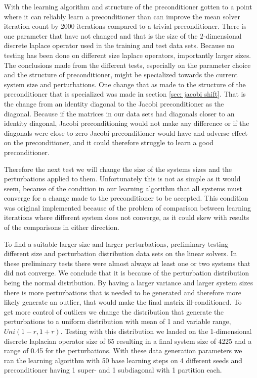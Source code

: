With the learning algorithm and structure of the preconditioner gotten to a point where it can reliably learn a preconditioner than can improve the mean solver iteration count by 2000 iterations compared to a trivial preconditioner. There is one parameter that have not changed and that is the size of the 2-dimensional discrete laplace operator used in the training and test data sets. Because no testing has been done on different size laplace operators, importantly larger sizes. The conclusions made from the different tests, especially on the parameter choice and the structure of preconditioner, might be specialized towards the current system size and perturbations. One change that as made to the structure of the preconditioner that is specialized was made in section \ref{sec: jacobi shift}. That is the change from an identity diagonal to the Jacobi preconditioner as the diagonal. Because if the matrices in our data sets had diagonals closer to an identity diagonal, Jacobi preconditioning would not make any difference or if the diagonals were close to zero Jacobi preconditioner would have and adverse effect on the preconditioner, and it could therefore struggle to learn a good preconditioner. 

Therefore the next test we will change the size of the systems sizes and the perturbations applied to them. Unfortunately this is not as simple as it would seem, because of the condition in our learning algorithm that all systems must converge for a change made to the preconditioner to be accepted. This condition was original implemented because of the problem of comparison between learning iterations where different system does not converge, as it could skew with results of the comparisons in either direction. 

To find a suitable larger size and larger perturbations, preliminary testing different size and perturbation distribution data sets on the linear solvers. In these preliminary tests there were almost always at least one or two systems that did not converge. We conclude that it is because of the perturbation distribution being the normal distribution. By having a larger variance and larger system sizes there is more perturbations that is needed to be generated and therefore more likely generate an outlier, that would make the final matrix ill-conditioned. To get more control of outliers we change the distribution that generate the perturbations to a uniform distribution with mean of 1 and variable range, \(Uni(1-r,1+r)\). Testing with this distribution we landed on the 1-dimensional discrete laplacian operator size of 65 resulting in a final system size of 4225 and a range of 0.45 for the perturbations. With these data generation parameters we ran the learning algorithm with 50 base learning steps on 4 different seeds and preconditioner having 1 super- and 1 subdiagonal with 1 partition each. 

